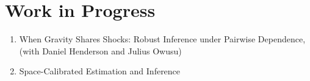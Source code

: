 \documentclass[12pt,letterpaper]{article}
\begin{document}
\section*{Work in Progress}
\begin{enumerate}

\item When Gravity Shares Shocks: Robust Inference under Pairwise Dependence, (with Daniel Henderson and Julius Owusu)

\item Space-Calibrated Estimation and Inference %

\end{enumerate}
\end{document}
